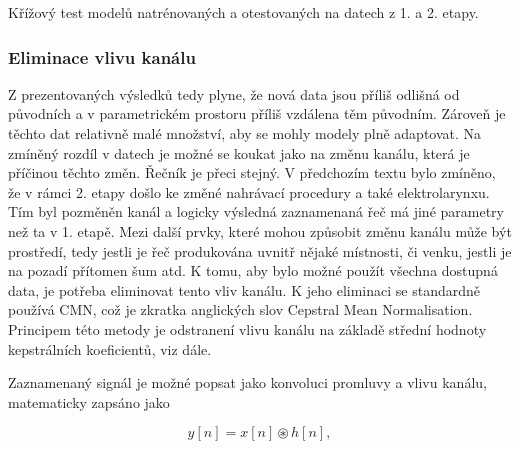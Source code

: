 
\begin{table}[htpb]
  \centering
  \def\arraystretch{1.5}
  \caption{Křížový test modelů natrénovaných a otestovaných na datech z 1. a 2. etapy.}
  \label{tab:experiments:normalization:cross}
\end{table}


\subsubsection{Eliminace vlivu kanálu}

Z prezentovaných výsledků tedy plyne, že nová data jsou příliš odlišná od původních a v parametrickém prostoru příliš vzdálena těm původním. Zároveň je těchto dat relativně malé množství, aby se mohly modely plně adaptovat. Na zmíněný rozdíl v datech je možné se koukat jako na změnu kanálu, která je příčinou těchto změn. Řečník je přeci stejný. V předchozím textu bylo zmíněno, že v rámci 2. etapy došlo ke změné nahrávací procedury a také elektrolarynxu. Tím byl pozměněn kanál a logicky výsledná zaznamenaná řeč má jiné parametry než ta v 1. etapě. Mezi další prvky, které mohou způsobit změnu kanálu může být prostředí, tedy jestli je řeč produkována uvnitř nějaké místnosti, či venku, jestli je na pozadí přítomen šum atd. K tomu, aby bylo možné použít všechna dostupná data, je potřeba eliminovat tento vliv kanálu. K jeho eliminaci se standardně používá CMN, což je zkratka anglických slov Cepstral Mean Normalisation. Principem této metody je odstranení vlivu kanálu na základě střední hodnoty kepstrálních koeficientů, viz dále.

Zaznamenaný signál je možné popsat jako konvoluci promluvy a vlivu kanálu, matematicky zapsáno jako

\begin{equation}
  y\left[n\right] = x\left[n\right] \circledast h\left[n\right],
  \label{eq:experiments:normalization:convolution}
\end{equation}

